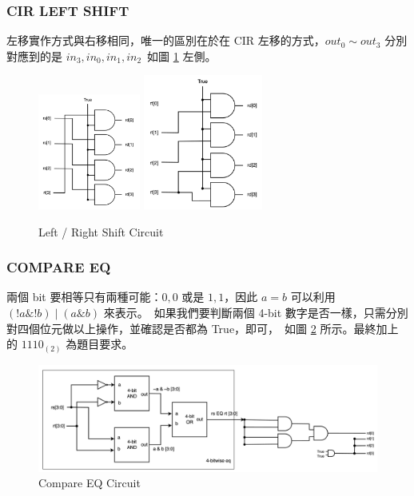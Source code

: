 \documentclass[10.5pt,compsoc,UTF8]{CjC}
\theoremstyle{mystyle}
\begin{document}
\subsubsection*{CIR LEFT SHIFT}
左移實作方式與右移相同，唯一的區別在於在 CIR 左移的方式，$out_0 \sim out_3$ 分別對應到的是 $in_3, in_0, in_1, in_2$\
如圖 \ref{fig:SHIFT} 左側。


\begin{figure}[htp]
  \centering
  \includegraphics[width=0.3\textwidth]{LSHIFT.png}
  \includegraphics[width=0.35\textwidth]{RSHIFT.png}
  \caption{Left / Right Shift Circuit}
  \label{fig:SHIFT}
\end{figure}

\subsubsection*{COMPARE EQ}
兩個 bit 要相等只有兩種可能：$0, 0$ 或是 $1, 1$，因此 $a = b$ 可以利用 $(!a \& !b) \mid (a \& b)$ 來表示。\ 
如果我們要判斷兩個 4-bit 數字是否一樣，只需分別對四個位元做以上操作，並確認是否都為 True，即可，\
如圖 \ref{fig:EQ} 所示。最終加上的 $1110_{(2)}$ 為題目要求。

\begin{figure}[htp]
  \centering
  \includegraphics[width=\textwidth]{EQ.png}
  \caption{Compare EQ Circuit}
  \label{fig:EQ}
\end{figure}
\end{document}
